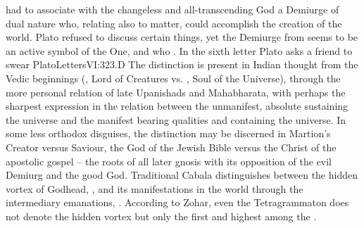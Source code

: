 had to associate with the changeless and all-transcending God a Demiurge of dual
nature who, relating also to matter, could accomplish the creation of the world.
Plato refused to discuss certain things, yet the Demiurge from 
seems to be an active symbol of the One,  and who . In the sixth letter Plato asks a
friend to swear \citet{in the name of the God who is captain of all things
  present and to come, and of the Father of that captain and
  cause.}{PlatoLetters}{VI:323.D}  The
distinction is present in Indian thought from the Vedic beginnings
(, Lord of Creatures vs. , Soul of the Universe),
through the more personal relation of late Upanishads and
Mahabharata, with perhaps
the sharpest expression in the relation between the unmanifest, absolute
 sustaining the universe and the manifest  bearing
qualities and containing the universe.  In some less orthodox disguises, the
distinction may be discerned in Martion's Creator versus Saviour, the God of the
Jewish Bible versus the Christ of the apostolic gospel -- the roots of all later
gnosis with its opposition of the evil Demiurg and the good
God. Traditional Cabala
distinguishes between the hidden vortex of Godhead, , and its
manifestations in the world through the intermediary emanations, .
According to Zohar, even the Tetragrammaton  does not denote the
hidden vortex but only the first and highest among the 
.
%
%



